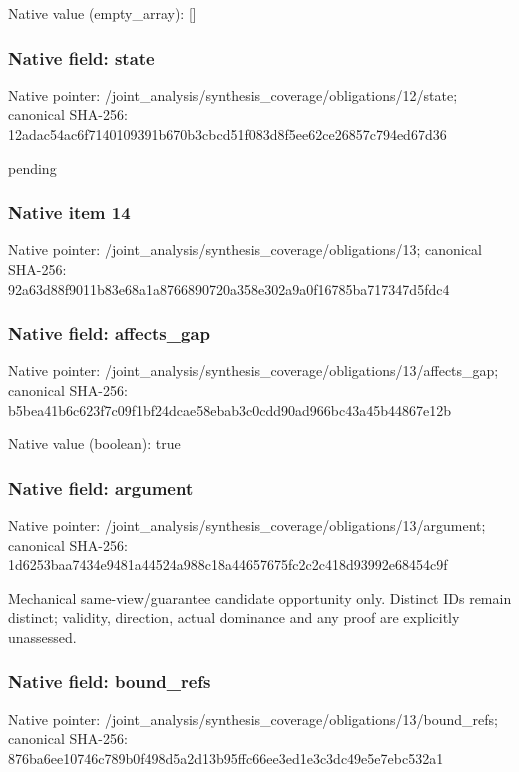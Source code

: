 \documentclass[10pt,a4paper]{article}
\begin{document}
Native value (empty\_\allowbreak{}array): []

\subsubsection{Native field: state}
Native pointer: /joint\_\allowbreak{}analysis/synthesis\_\allowbreak{}coverage/obligations/12/state; canonical SHA-256: 12adac54ac6f7140109391b670b3cbcd51f083d8f5ee62ce26857c794ed67d36

\begingroup\raggedright\sloppy pending\par\endgroup

\subsubsection{Native item 14}
Native pointer: /joint\_\allowbreak{}analysis/synthesis\_\allowbreak{}coverage/obligations/13; canonical SHA-256: 92a63d88f9011b83e68a1a8766890720a358e302a9a0f16785ba717347d5fdc4

\subsubsection{Native field: affects\_\allowbreak{}gap}
Native pointer: /joint\_\allowbreak{}analysis/synthesis\_\allowbreak{}coverage/obligations/13/affects\_\allowbreak{}gap; canonical SHA-256: b5bea41b6c623f7c09f1bf24dcae58ebab3c0cdd90ad966bc43a45b44867e12b

Native value (boolean): true

\subsubsection{Native field: argument}
Native pointer: /joint\_\allowbreak{}analysis/synthesis\_\allowbreak{}coverage/obligations/13/argument; canonical SHA-256: 1d6253baa7434e9481a44524a988c18a44657675fc2c2c418d93992e68454c9f

\begingroup\raggedright\sloppy Mechanical same-view/\allowbreak{}guarantee candidate opportunity only. Distinct IDs remain distinct;\allowbreak{} validity,\allowbreak{} direction,\allowbreak{} actual dominance and any proof are explicitly unassessed.\par\endgroup

\subsubsection{Native field: bound\_\allowbreak{}refs}
Native pointer: /joint\_\allowbreak{}analysis/synthesis\_\allowbreak{}coverage/obligations/13/bound\_\allowbreak{}refs; canonical SHA-256: 876ba6ee10746c789b0f498d5a2d13b95ffc66ee3ed1e3c3dc49e5e7ebc532a1
\end{document}
